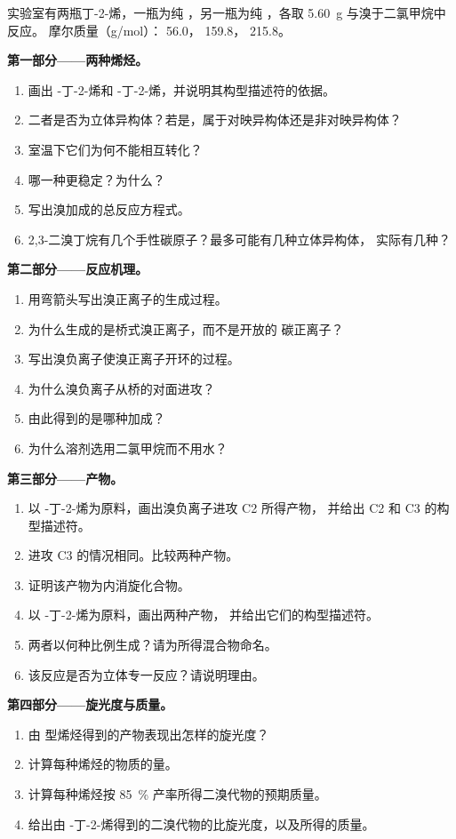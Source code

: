 \begin{problem}
\label{pb:b1:electrophilic-additions:1}
实验室有两瓶丁-2-烯，一瓶为纯 ，另一瓶为纯
，各取 \qty{5.60}{g} 与溴于二氯甲烷中反应。
摩尔质量（\unit{g/mol}）： 56.0，
159.8， 215.8。

\medskip
\noindent\textbf{第一部分——两种烯烃。}
\begin{enumerate}
  \item 画出 -丁-2-烯和 -丁-2-烯，并说明其构型描述符的依据。
  \item 二者是否为立体异构体？若是，属于对映异构体还是非对映异构体？
  \item 室温下它们为何不能相互转化？
  \item 哪一种更稳定？为什么？
  \item 写出溴加成的总反应方程式。
  \item 2,3-二溴丁烷有几个手性碳原子？最多可能有几种立体异构体，
        实际有几种？
\end{enumerate}

\medskip
\noindent\textbf{第二部分——反应机理。}
\begin{enumerate}[resume]
  \item 用弯箭头写出溴正离子的生成过程。
  \item 为什么生成的是桥式溴正离子，而不是开放的
        碳正离子？
  \item 写出溴负离子使溴正离子开环的过程。
  \item 为什么溴负离子从桥的对面进攻？
  \item 由此得到的是哪种加成？
  \item 为什么溶剂选用二氯甲烷而不用水？
\end{enumerate}

\medskip
\noindent\textbf{第三部分——产物。}
\begin{enumerate}[resume]
  \item 以 -丁-2-烯为原料，画出溴负离子进攻 C2 所得产物，
        并给出 C2 和 C3 的构型描述符。
  \item 进攻 C3 的情况相同。比较两种产物。
  \item 证明该产物为内消旋化合物。
  \item 以 -丁-2-烯为原料，画出两种产物，
        并给出它们的构型描述符。
  \item 两者以何种比例生成？请为所得混合物命名。
  \item 该反应是否为立体专一反应？请说明理由。
\end{enumerate}

\medskip
\noindent\textbf{第四部分——旋光度与质量。}
\begin{enumerate}[resume]
  \item 由  型烯烃得到的产物表现出怎样的旋光度？
  \item 计算每种烯烃的物质的量。
  \item 计算每种烯烃按
        \qty{85}{\percent} 产率所得二溴代物的预期质量。
  \item 给出由
        -丁-2-烯得到的二溴代物的比旋光度，以及所得的质量。
\end{enumerate}
\end{problem}
